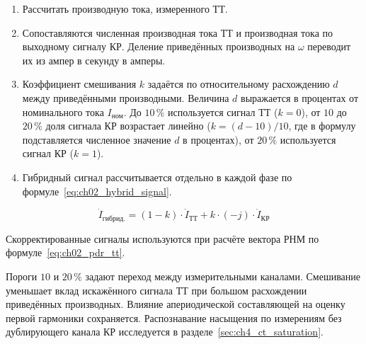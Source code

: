 \begin{enumerate}
\item Рассчитать производную тока, измеренного ТТ.

\item Сопоставляются численная производная тока ТТ и производная тока по выходному сигналу КР. Деление приведённых производных на $\omega$ переводит их из ампер в секунду в амперы.

\item Коэффициент смешивания $k$ задаётся по относительному расхождению $d$ между приведёнными производными. Величина $d$ выражается в процентах от номинального тока $I_{\text{ном}}$. До $10\,\%$ используется сигнал ТТ ($k=0$), от $10$ до $20\,\%$ доля сигнала КР возрастает линейно ($k=(d-10)/10$, где в формулу подставляется численное значение $d$ в процентах), от $20\,\%$ используется сигнал КР ($k=1$).

\item Гибридный сигнал рассчитывается отдельно в каждой фазе по формуле~\eqref{eq:ch02_hybrid_signal}.
\end{enumerate}

\begin{equation}
\label{eq:ch02_hybrid_signal}
\dot{I}_{\text{гибрид.}} = (1 - k) \cdot \dot{I}_{\text{ТТ}} + k \cdot (-j) \cdot \dot{I}_{\text{КР}}
\end{equation}

Скорректированные сигналы используются при расчёте вектора РНМ по формуле~\eqref{eq:ch02_pdr_tt}.

Пороги $10$ и $20\,\%$ задают переход между измерительными каналами. Смешивание уменьшает вклад искажённого сигнала ТТ при большом расхождении приведённых производных. Влияние апериодической составляющей на оценку первой гармоники сохраняется. Распознавание насыщения по измерениям без дублирующего канала КР исследуется в разделе~\ref{sec:ch4_ct_saturation}.


